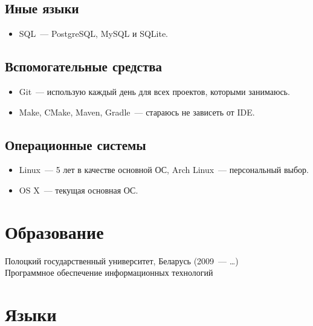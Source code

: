     \subsection*{Иные языки}

      \begin{itemize}

        \item SQL~--- PostgreSQL, MySQL и SQLite.

      \end{itemize}

    \subsection*{Вспомогательные средства}

      \begin{itemize}

        \item Git~--- использую каждый день для всех проектов, которыми занимаюсь.

        \item Make, CMake, Maven, Gradle~--- стараюсь не зависеть от IDE.

      \end{itemize}

    \subsection*{Операционные системы}

      \begin{itemize}

        \item Linux~--- 5 лет в качестве основной ОС, Arch Linux~--- персональный выбор.

        \item OS X~--- текущая основная ОС.

      \end{itemize}


  \section*{Образование}

    Полоцкий государственный университет, Беларусь (2009~--- \dots) \\
    Программное обеспечение информационных технологий


  \section*{Языки}

